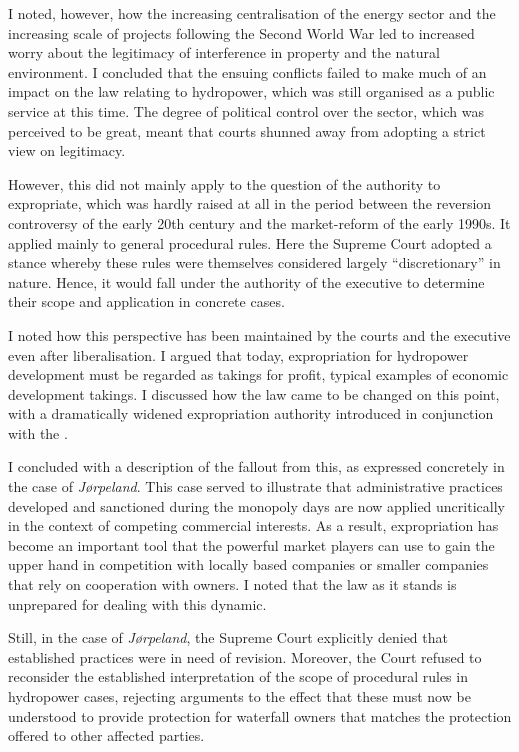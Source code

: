 I noted, however, how the increasing centralisation of the energy sector and the increasing scale of projects following the Second World War led to increased worry about the legitimacy of interference in property and the natural environment. I concluded that the ensuing conflicts failed to make much of an impact on the law relating to hydropower, which was still organised as a public service at this time. 
The degree of political control over the sector, which was perceived to be great, meant that courts shunned away from adopting a strict view on legitimacy. 

However, this did not mainly apply to the question of the authority to expropriate, which was hardly raised at all in the period between the reversion controversy of the early 20th century and the market-reform of the early 1990s. It applied mainly to general procedural rules. Here the Supreme Court adopted a stance whereby these rules were themselves considered largely ``discretionary'' in nature. Hence, it would fall under the authority of the executive to determine their scope and application in concrete cases.

I noted how this perspective has been maintained by the courts and the executive even after liberalisation. I argued that today, expropriation for hydropower development must be regarded as takings for profit, typical examples of economic development takings. I discussed how the law came to be changed on this point, with a dramatically widened expropriation authority introduced in conjunction with the \cite{wra00}.

I concluded with a description of the fallout from this, as expressed concretely in the case of {\it Jørpeland}. This case served to illustrate that administrative practices developed and sanctioned during the monopoly days are now applied uncritically in the context of competing commercial interests. As a result,  expropriation has become an important tool that the powerful market players can use to gain the upper hand in competition with locally based companies or smaller companies that rely on cooperation with owners. I noted that the law as it stands is unprepared for dealing with this dynamic. 

Still, in the case of {\it Jørpeland}, the Supreme Court explicitly denied that established practices were in need of revision. Moreover, the Court refused to reconsider the established interpretation of the scope of procedural rules in hydropower cases, rejecting arguments to the effect that these must now be understood to provide protection for waterfall owners that matches the protection offered to other affected parties.

